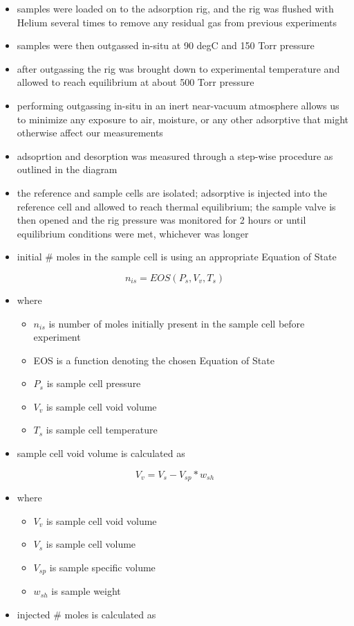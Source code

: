 \documentclass[11pt]{article}
\begin{document}
\begin{itemize}
\item samples were loaded on to the adsorption rig, and the rig was flushed with Helium several times to remove any residual gas from previous experiments
\item samples were then outgassed in-situ at 90 degC and 150 Torr pressure
\item after outgassing the rig was brought down to experimental temperature and allowed to reach equilibrium at about 500 Torr pressure
\item performing outgassing in-situ in an inert near-vacuum atmosphere allows us to minimize any exposure to air, moisture, or any other adsorptive that might otherwise affect our measurements
\item adsoprtion and desorption was measured through a step-wise procedure as outlined in the diagram
\item the reference and sample cells are isolated; adsorptive is injected into the reference cell and allowed to reach thermal equilibrium; the sample valve is then opened and the rig pressure was monitored for 2 hours or until equilibrium conditions were met, whichever was longer
\item initial \# moles in the sample cell is using an appropriate Equation of State
\end{itemize}
\begin{equation}
n_{is} = EOS(P_{s},V_{v},T_{s})
\end{equation}
\begin{itemize}
\item where
\begin{itemize}
\item \(n_{is}\) is number of moles initially present in the sample cell before experiment
\item EOS is a function denoting the chosen Equation of State
\item \(P_s\) is sample cell pressure
\item \(V_v\) is sample cell void volume
\item \(T_s\) is sample cell temperature
\end{itemize}
\item sample cell void volume is calculated as
\end{itemize}
\begin{equation}
V_v = V_s - V_{sp} * w_{sh}
\end{equation}
\begin{itemize}
\item where
\begin{itemize}
\item \(V_v\) is sample cell void volume
\item \(V_s\) is sample cell volume
\item \(V_{sp}\) is sample specific volume
\item \(w_{sh}\) is sample weight
\end{itemize}
\item injected \# moles is calculated as
\end{itemize}
\end{document}
